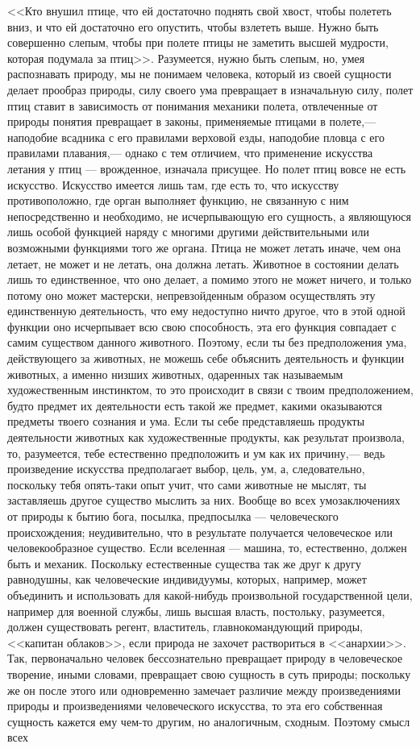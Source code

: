 \documentclass[12pt]{article}
\begin{document}
<<Кто внушил птице, что ей достаточно поднять свой хвост, чтобы полететь вниз, и что ей достаточно его опустить, чтобы взлететь выше. Нужно быть совершенно слепым, чтобы при полете птицы не заметить высшей мудрости, которая подумала за птиц>>. Разумеется, нужно быть слепым, но, умея распознавать природу, мы не понимаем человека, который из своей сущности делает прообраз природы, силу своего ума превращает в изначальную силу, полет птиц ставит в зависимость от понимания механики полета, отвлеченные от природы понятия превращает в законы, применяемые птицами в полете,--- наподобие всадника с его правилами верховой езды, наподобие пловца с его правилами плавания,--- однако с тем отличием, что применение искусства летания у птиц --- врожденное, изначала присущее. Но полет птиц вовсе не есть искусство. Искусство имеется лишь там, где есть то, что искусству противоположно, где орган выполняет функцию, не связанную с ним непосредственно и необходимо, не исчерпывающую его сущность, а являющуюся лишь особой функцией наряду с многими другими действительными или возможными функциями того же органа. Птица не может летать иначе, чем она летает, не может и не летать, она должна летать. Животное в состоянии делать лишь то единственное, что оно делает, а помимо этого не может ничего, и только потому оно может мастерски, непревзойденным образом осуществлять эту единственную деятельность, что ему недоступно ничто другое, что в этой одной функции оно исчерпывает всю свою способность, эта его функция совпадает с самим существом данного животного. Поэтому, если ты без предположения ума, действующего за животных, не можешь себе объяснить деятельность и функции животных, а именно низших животных, одаренных так называемым художественным инстинктом, то это происходит в связи с твоим предположением, будто предмет их деятельности есть такой же предмет, какими оказываются предметы твоего сознания и ума. Если ты себе представляешь продукты деятельности животных как художественные продукты, как результат произвола, то, разумеется, тебе естественно предположить и ум как их причину,--- ведь произведение искусства предполагает выбор, цель, ум, а, следовательно, поскольку тебя опять-таки опыт учит, что сами животные не мыслят, ты заставляешь другое существо мыслить за них. Вообще во всех умозаключениях от природы к бытию бога, посылка, предпосылка --- человеческого происхождения; неудивительно, что в результате получается человеческое или человекообразное существо. Если вселенная --- машина, то, естественно, должен быть и механик. Поскольку естественные существа так же друг к другу равнодушны, как человеческие индивидуумы, которых, например, может объединить и использовать для какой-нибудь произвольной государственной цели, например для военной службы, лишь высшая власть, постольку, разумеется, должен существовать регент, властитель, главнокомандующий природы, <<капитан облаков>>, если природа не захочет раствориться в <<анархии>>. Так, первоначально человек бессознательно превращает природу в человеческое творение, иными словами, превращает свою сущность в суть природы; поскольку же он после этого или одновременно замечает различие между произведениями природы и произведениями человеческого искусства, то эта его собственная сущность кажется ему чем-то другим, но аналогичным, сходным. Поэтому смысл всех 
\end{document}
